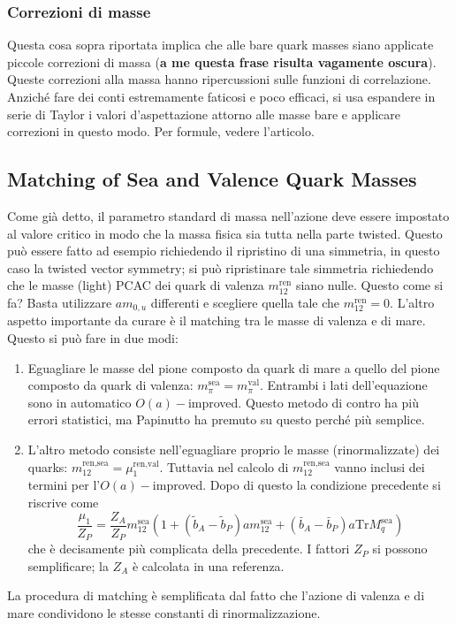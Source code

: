 \documentclass[12pt,a4paper,openright]{article}
\newcommand{\colg}{\textcolor{PineGreen}}
\newcommand{\colr}{\textcolor{BrickRed}}
\newcommand{\ren}{{\text{ren}}}
\newcommand{\oai}{$O(a)-$improved}
\newcommand{\tr}{\text{Tr}}
\begin{document}
\subsubsection*{Correzioni di masse}
Questa cosa sopra riportata implica che alle bare quark masses siano applicate piccole correzioni di massa (\colr{\bf a me questa frase risulta vagamente oscura}).
Queste correzioni alla massa hanno ripercussioni sulle funzioni di correlazione.
Anziché fare dei conti estremamente faticosi e poco efficaci, si usa espandere in serie di Taylor i valori d'aspettazione attorno alle masse bare e applicare correzioni in questo modo.
Per formule, vedere l'articolo.

\subsection{Matching of Sea and Valence Quark Masses}
Come già detto, \colg{il parametro standard di massa nell'azione deve essere impostato al valore critico in modo che la massa fisica sia tutta nella parte twisted}.
Questo può essere fatto ad esempio richiedendo il ripristino di una simmetria, in questo caso la twisted vector symmetry;
si può ripristinare tale simmetria richiedendo che le masse (light) PCAC dei quark di valenza $m_{12}^\ren$ siano nulle.
Questo come si fa? Basta utilizzare $am_{0,u}$ differenti e scegliere quella tale che $m_{12}^\ren =0$.
\newline
\newline
L'altro aspetto importante da curare è il \colg{matching tra le masse di valenza e di mare}. Questo si può fare in due modi:
\begin{enumerate}
  \item Eguagliare le masse del pione composto da quark di mare a quello del pione composto da quark di valenza: $m_\pi^{\text{sea}} = m_\pi^{\text{val}}$. Entrambi i lati dell'equazione sono in automatico \oai. Questo metodo di contro ha più errori statistici, ma Papinutto ha premuto su questo perché più semplice.
  \item L'altro metodo consiste nell'eguagliare proprio le masse (rinormalizzate) dei quarks: $m_{12}^{\ren,\text{sea}} = \mu_1^{\ren,\text{val}}$.
        Tuttavia nel calcolo di $m_{12}^{\ren,\text{sea}}$ vanno inclusi dei termini per l'\oai. Dopo di questo la condizione precedente si riscrive come $$\frac{\mu_1}{Z_P} = \frac{Z_A}{Z_P} m_{12}^\text{sea} \left( 1 + (\tilde b_A -\tilde b_P) a m_{12}^\text{sea} + (\bar b_A -\bar b_P)a \tr M_q^\text{sea} \right)$$
        che è decisamente più complicata della precedente. I fattori $Z_P$ si possono semplificare; la $Z_A$ è calcolata in una referenza.
\end{enumerate}
La procedura di matching è semplificata dal fatto che l'azione di valenza e di mare condividono le stesse constanti di rinormalizzazione.
\end{document}
